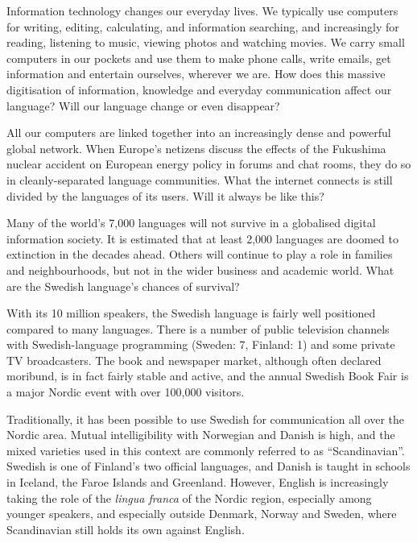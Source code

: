 \begin{multicols}{2}

Information technology changes our everyday lives. We typically use
computers for writing, editing, calculating, and information
searching, and increasingly for reading, listening to music, viewing
photos and watching movies. We carry small computers in our pockets
and use them to make phone calls, write emails, get information and
entertain ourselves, wherever we are. How does this massive
digitisation of information, knowledge and everyday communication
affect our language? Will our language change or even disappear?


All our computers are linked together into an increasingly dense and
powerful global network. When Europe's netizens discuss the effects of
the Fukushima nuclear accident on European energy policy in forums and
chat rooms, they do so in cleanly-separated language communities. What
the internet connects is still divided by the languages of its
users. Will it always be like this?

Many of the world’s 7,000 languages will not survive in a globalised
digital information society. It is estimated that at least 2,000
languages are doomed to extinction in the decades ahead. Others will
continue to play a role in families and neighbourhoods, but not in the
wider business and academic world. What are the Swedish language’s
chances of survival?

With its 10 million speakers, the Swedish lang\-uage is fairly well
positioned compared to many lang\-uages. There is a number of public
tele\-vision \mbox{channels} with Swedish-language programming (Sweden: 7,
Finland: 1) and some private TV broadcasters. The book and newspaper
market, although often declared moribund, is in fact fairly \mbox{stable} and
active, and the annual Swedish Book Fair is a major Nordic event with
over 100,000 visitors.

Traditionally, it has been possible to use Swedish for communication
all over the Nordic area. \mbox{Mutual} intelligibility with Norwegian and
\mbox{Danish} is high, and the mixed varieties used in this context are
commonly referred to as ``Scandinavian''. Swedish is one of Finland's
two official languages, and \mbox{Danish} is taught in schools in Iceland,
the Faroe \mbox{Islands} and Greenland. However, English is increasingly
taking the role of the \emph{lingua franca} of the Nordic \mbox{region}, especially
among younger speakers, and especially outside Denmark, Norway and
\mbox{Sweden}, where Scandinavian still holds its own against \mbox{English}.


\end{multicols}
